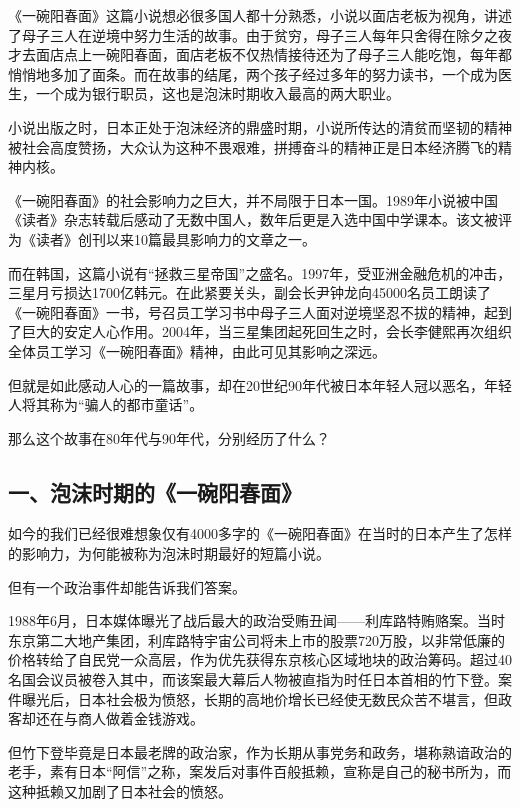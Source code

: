 

《一碗阳春面》这篇小说想必很多国人都十分熟悉，小说以面店老板为视角，讲述了母子三人在逆境中努力生活的故事。由于贫穷，母子三人每年只舍得在除夕之夜才去面店点上一碗阳春面，面店老板不仅热情接待还为了母子三人能吃饱，每年都悄悄地多加了面条。而在故事的结尾，两个孩子经过多年的努力读书，一个成为医生，一个成为银行职员，这也是泡沫时期收入最高的两大职业。

小说出版之时，日本正处于泡沫经济的鼎盛时期，小说所传达的清贫而坚韧的精神被社会高度赞扬，大众认为这种不畏艰难，拼搏奋斗的精神正是日本经济腾飞的精神内核。

《一碗阳春面》的社会影响力之巨大，并不局限于日本一国。1989年小说被中国《读者》杂志转载后感动了无数中国人，数年后更是入选中国中学课本。该文被评为《读者》创刊以来10篇最具影响力的文章之一。

而在韩国，这篇小说有“拯救三星帝国”之盛名。1997年，受亚洲金融危机的冲击，三星月亏损达1700亿韩元。在此紧要关头，副会长尹钟龙向45000名员工朗读了《一碗阳春面》一书，号召员工学习书中母子三人面对逆境坚忍不拔的精神，起到了巨大的安定人心作用。2004年，当三星集团起死回生之时，会长李健熙再次组织全体员工学习《一碗阳春面》精神，由此可见其影响之深远。

但就是如此感动人心的一篇故事，却在20世纪90年代被日本年轻人冠以恶名，年轻人将其称为“骗人的都市童话”。

那么这个故事在80年代与90年代，分别经历了什么？

\subsection{一、泡沫时期的《一碗阳春面》}

如今的我们已经很难想象仅有4000多字的《一碗阳春面》在当时的日本产生了怎样的影响力，为何能被称为泡沫时期最好的短篇小说。

但有一个政治事件却能告诉我们答案。

1988年6月，日本媒体曝光了战后最大的政治受贿丑闻——利库路特贿赂案。当时东京第二大地产集团，利库路特宇宙公司将未上市的股票720万股，以非常低廉的价格转给了自民党一众高层，作为优先获得东京核心区域地块的政治筹码。超过40名国会议员被卷入其中，而该案最大幕后人物被直指为时任日本首相的竹下登。案件曝光后，日本社会极为愤怒，长期的高地价增长已经使无数民众苦不堪言，但政客却还在与商人做着金钱游戏。

但竹下登毕竟是日本最老牌的政治家，作为长期从事党务和政务，堪称熟谙政治的老手，素有日本“阿信”之称，案发后对事件百般抵赖，宣称是自己的秘书所为，而这种抵赖又加剧了日本社会的愤怒。

